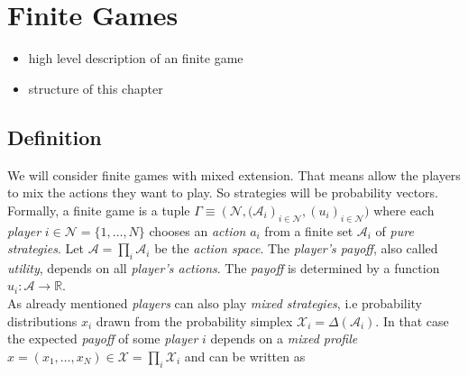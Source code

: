 
\chapter{Finite Games}\label{chapter:finiteGames}

\begin{itemize}
    \item high level description of an finite game
    \item structure of this chapter
\end{itemize}

\begin{comment}
    We are thus led to the following fundamental question: if all players of a repeated game employ a no-regret updating policy, do their actions converge to a Nash equilibrium of the underlying game? In general, the answer to this question is a resounding “no”. Even in simple, finite games, no-regret learning may cycle [27] and its limit set may contain highly non- rationalizable strategies that assign positive weight only to strictly dominated strategies [48]. As such, our aim in this paper is twofold \cite{mertikopoulos} p.466
\end{comment}

\section{Definition}\label{section:definition}

We will consider finite games with mixed extension. That means allow the players to mix the actions they want to play. So strategies will be probability vectors. \\
Formally, a finite game is a tuple $\Gamma \equiv (\mathcal{N}, {(\mathcal{A}_i})_{i\in\mathcal{N}},{(u_i)}_{i\in\mathcal{N}})$ where each \textit{player} $i \in \mathcal{N} = \{1,\dots,N\}$ chooses an \textit{action} $a_i$ from a finite set $\mathcal{A}_i$ of \textit{pure strategies}. Let $\mathcal{A} = \prod_{i}\mathcal{A}_i$ be the \textit{action space}. The \textit{player's payoff}, also called \textit{utility}, depends on all \textit{player's actions}. The \textit{payoff} is determined by a function $u_i : \mathcal{A} \to \mathbb{R} $. \\
As already mentioned \textit{players} can also play \textit{mixed strategies}, i.e probability distributions $x_i$ drawn from the probability simplex $\mathcal{X}_i = \Delta(\mathcal{A}_i)$. In that case the expected \textit{payoff} of some \textit{player} $i$ depends on a \textit{mixed profile} $x = (x_1,\dots,x_N) \in \mathcal{X} = \prod_{i}\mathcal{X}_i$ and can be written as 

